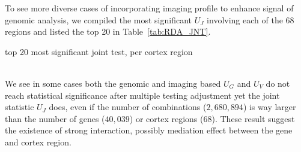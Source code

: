 To see more diverse cases of incorporating imaging profile to enhance signal of genomic analysis, we compiled the most significant $U_J$ involving each of the 68 regions and listed the top 20 in Table~\ref{tab:RDA_JNT}.
\begin{table}[!htbp]
  \centering
  \small
  \caption{top 20 most significant joint test, per cortex region}\label{tab:RDA_JNT}
  
\end{table} \\
We see in some cases both the genomic and imaging based $U_G$ and $U_V$ do not reach statistical significance after multiple testing adjustment yet the joint statistic $U_J$ does, even if the number of combinations ($2,680,894$) is way larger than the number of genes ($40,039$) or cortex regions ($68$). These result suggest the existence of strong interaction, possibly mediation effect between the gene and cortex region.
